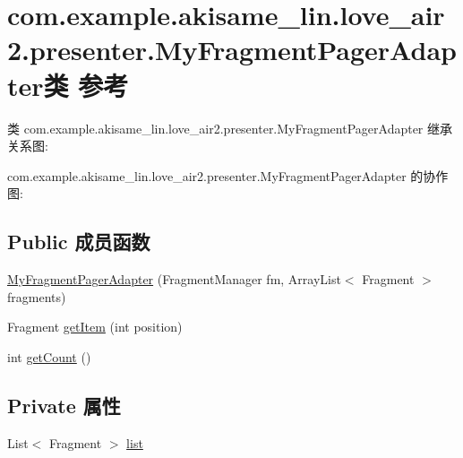 \hypertarget{classcom_1_1example_1_1akisame__lin_1_1love__air2_1_1presenter_1_1_my_fragment_pager_adapter}{}\section{com.\+example.\+akisame\+\_\+lin.\+love\+\_\+air2.\+presenter.\+My\+Fragment\+Pager\+Adapter类 参考}
\label{classcom_1_1example_1_1akisame__lin_1_1love__air2_1_1presenter_1_1_my_fragment_pager_adapter}


类 com.\+example.\+akisame\+\_\+lin.\+love\+\_\+air2.\+presenter.\+My\+Fragment\+Pager\+Adapter 继承关系图\+:


com.\+example.\+akisame\+\_\+lin.\+love\+\_\+air2.\+presenter.\+My\+Fragment\+Pager\+Adapter 的协作图\+:
\subsection*{Public 成员函数}
\begin{DoxyCompactItemize}
\item 
\mbox{\hyperlink{classcom_1_1example_1_1akisame__lin_1_1love__air2_1_1presenter_1_1_my_fragment_pager_adapter_abc40f4e408236d62e6a7aca668622538}{My\+Fragment\+Pager\+Adapter}} (Fragment\+Manager fm, Array\+List$<$ Fragment $>$ fragments)
\item 
Fragment \mbox{\hyperlink{classcom_1_1example_1_1akisame__lin_1_1love__air2_1_1presenter_1_1_my_fragment_pager_adapter_a60c5977d5171e07e3bdd97d31e12a316}{get\+Item}} (int position)
\item 
int \mbox{\hyperlink{classcom_1_1example_1_1akisame__lin_1_1love__air2_1_1presenter_1_1_my_fragment_pager_adapter_a2587e9b4d788db25b0a09b857b59e0f1}{get\+Count}} ()
\end{DoxyCompactItemize}
\subsection*{Private 属性}
\begin{DoxyCompactItemize}
\item 
List$<$ Fragment $>$ \mbox{\hyperlink{classcom_1_1example_1_1akisame__lin_1_1love__air2_1_1presenter_1_1_my_fragment_pager_adapter_a8908e8c44654192f086c932ada80af03}{list}}
\end{DoxyCompactItemize}


